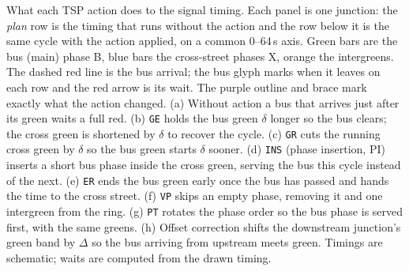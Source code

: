 What each TSP action does to the signal timing. Each panel is one junction: the \emph{plan} row is the timing that runs without the action and the row below it is the same cycle with the action applied, on a common 0--64\,s axis. Green bars are the bus (main) phase \textsf{B}, blue bars the cross-street phases \textsf{X}, orange the intergreens. The dashed red line is the bus arrival; the bus glyph marks when it leaves on each row and the red arrow is its wait. The purple outline and brace mark exactly what the action changed. (a) Without action a bus that arrives just after its green waits a full red. (b) \texttt{GE} holds the bus green $\delta$ longer so the bus clears; the cross green is shortened by $\delta$ to recover the cycle. (c) \texttt{GR} cuts the running cross green by $\delta$ so the bus green starts $\delta$ sooner. (d) \texttt{INS} (phase insertion, PI) inserts a short bus phase inside the cross green, serving the bus this cycle instead of the next. (e) \texttt{ER} ends the bus green early once the bus has passed and hands the time to the cross street. (f) \texttt{VP} skips an empty phase, removing it and one intergreen from the ring. (g) \texttt{PT} rotates the phase order so the bus phase is served first, with the same greens. (h) Offset correction shifts the downstream junction's green band by $\Delta$ so the bus arriving from upstream meets green. Timings are schematic; waits are computed from the drawn timing.
